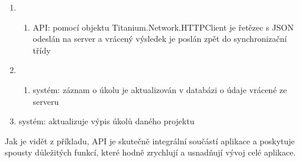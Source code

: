 \begin{enumerate}
\begin{enumerate}
\end{enumerate}
\item \begin{enumerate}
\item API: pomocí objektu Titanium.Network.HTTPClient je řetězec s JSON odeslán na server a vrácený výsledek je poslán zpět do synchronizační třídy
\end{enumerate}
\item \begin{enumerate}
\item systém: záznam o úkolu je aktualizován v databázi o údaje vrácené ze serveru
\end{enumerate}
\item systém: aktualizuje výpis úkolů daného projektu
\end{enumerate}

Jak je vidět z příkladu, API je skutečně integrální součástí aplikace a poskytuje spousty důležitých funkcí, které hodně zrychlují a usnadňují vývoj celé aplikace.